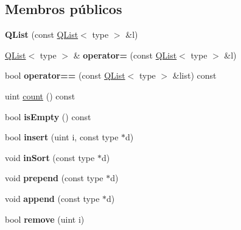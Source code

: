 \subsection*{Membros públicos}
\begin{DoxyCompactItemize}
\item 
\hypertarget{class_q_list_a75b4d0de279eda56f45ddaa055c2f4cc}{{\bfseries Q\-List} (const \hyperlink{class_q_list}{Q\-List}$<$ type $>$ \&l)}\label{class_q_list_a75b4d0de279eda56f45ddaa055c2f4cc}

\item 
\hypertarget{class_q_list_a8a39eb496745578fabd5f7830c626e82}{\hyperlink{class_q_list}{Q\-List}$<$ type $>$ \& {\bfseries operator=} (const \hyperlink{class_q_list}{Q\-List}$<$ type $>$ \&l)}\label{class_q_list_a8a39eb496745578fabd5f7830c626e82}

\item 
\hypertarget{class_q_list_a6a96a471223ceb0c60a601c640a8344e}{bool {\bfseries operator==} (const \hyperlink{class_q_list}{Q\-List}$<$ type $>$ \&list) const }\label{class_q_list_a6a96a471223ceb0c60a601c640a8344e}

\item 
uint \hyperlink{class_q_list_a774149fc271ebaba2aabcd183a836e8f}{count} () const 
\item 
\hypertarget{class_q_list_a479432127ee77145cc19d6a2d1590821}{bool {\bfseries is\-Empty} () const }\label{class_q_list_a479432127ee77145cc19d6a2d1590821}

\item 
\hypertarget{class_q_list_a0bb4dc482bedee8a49c6c53ea0334f71}{bool {\bfseries insert} (uint i, const type $\ast$d)}\label{class_q_list_a0bb4dc482bedee8a49c6c53ea0334f71}

\item 
\hypertarget{class_q_list_a9d780b0607e5495cfb99dfbe9e173f89}{void {\bfseries in\-Sort} (const type $\ast$d)}\label{class_q_list_a9d780b0607e5495cfb99dfbe9e173f89}

\item 
\hypertarget{class_q_list_ab89d5e739f9de8220ea9bca66deaee10}{void {\bfseries prepend} (const type $\ast$d)}\label{class_q_list_ab89d5e739f9de8220ea9bca66deaee10}

\item 
\hypertarget{class_q_list_abe2dcc1c3f96505a1889f3d53f224631}{void {\bfseries append} (const type $\ast$d)}\label{class_q_list_abe2dcc1c3f96505a1889f3d53f224631}

\item 
\hypertarget{class_q_list_ab135b8c4b6ad3faed8669a22d116c54a}{bool {\bfseries remove} (uint i)}\label{class_q_list_ab135b8c4b6ad3faed8669a22d116c54a}


\end{DoxyCompactItemize}

